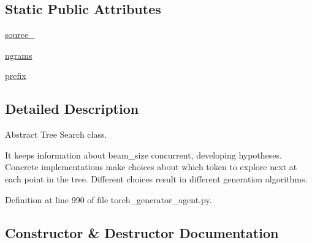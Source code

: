 \subsection*{Static Public Attributes}
\begin{DoxyCompactItemize}
\item 
\hyperlink{classparlai_1_1core_1_1torch__generator__agent_1_1TreeSearch_aeeed17550050be7b86c9e238b9df66e5}{source\+\_\+}
\item 
\hyperlink{classparlai_1_1core_1_1torch__generator__agent_1_1TreeSearch_aa9b00008fefdb77e7701ddbfc1865919}{ngrams}
\item 
\hyperlink{classparlai_1_1core_1_1torch__generator__agent_1_1TreeSearch_a2845139bf44df2fa8428565cd7558ce2}{prefix}
\end{DoxyCompactItemize}


\subsection{Detailed Description}
\begin{DoxyVerb}Abstract Tree Search class.

It keeps information about beam_size concurrent, developing hypotheses. Concrete
implementations make choices about which token to explore next at each point in the
tree. Different choices result in different generation algorithms.
\end{DoxyVerb}
 

Definition at line 990 of file torch\+\_\+generator\+\_\+agent.\+py.



\subsection{Constructor \& Destructor Documentation}
\mbox{\label{classparlai_1_1core_1_1torch__generator__agent_1_1TreeSearch_a3462e30fc27b2a215773a38cf09f6b46}} 
